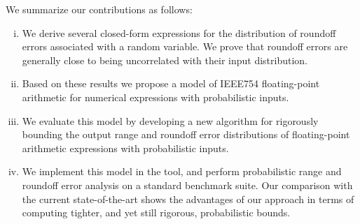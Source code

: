 We summarize our contributions as follows:
\begin{enumerate}[(i)]
\itemsep0.75em 
%
\item We derive several closed-form expressions for the distribution of roundoff errors associated with a random variable.  We prove that roundoff errors are generally close to being uncorrelated with their input distribution.
%
\item Based on these results we propose a model of IEEE754 floating-point arithmetic for numerical expressions with probabilistic inputs.
%
\item We evaluate this model by developing a new algorithm for rigorously bounding the output range and roundoff error distributions of floating-point arithmetic expressions with probabilistic inputs.
%
\item We implement this model in the \Tool tool, and perform probabilistic range and roundoff error analysis on a standard benchmark suite. Our comparison
	with the current state-of-the-art shows the advantages of our approach in terms of computing tighter, and yet still rigorous,
	probabilistic bounds.
\end{enumerate}

